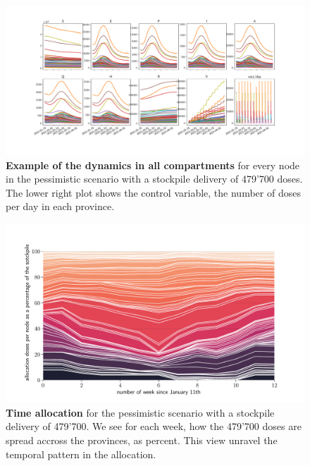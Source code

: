 \begin{figure}[!ht]
    \centering
    \includegraphics[width=\textwidth]{fig_italy-ocp/figuresSI/SI_all_states.pdf}
    \caption[Example of the dynamics in all compartments]{\textbf{Example of the dynamics in all compartments} for every node in the pessimistic scenario with a stockpile delivery of 479'700 doses. The lower right plot shows the control variable, the number of doses per day in each province.}
    \label{fig:OC_ts_all}
\end{figure}

\begin{figure}[!ht]
    \centering
    \includegraphics[width=\textwidth]{fig_italy-ocp/figuresSI/SI_ts_optimal_stackplot_proportional.pdf}
    \caption[Time allocation for the pessimistic scenario]{\textbf{Time allocation} for the pessimistic scenario with a stockpile delivery of 479'700. We see for each week, how the 479'700 doses are spread accross the provinces, as percent. This view unravel the temporal pattern in the allocation.}
    \label{fig:OC_temporal_alloaction}
\end{figure}


